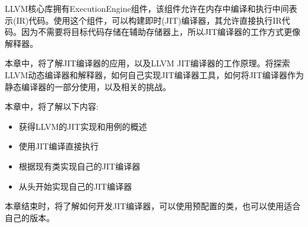 
LLVM核心库拥有ExecutionEngine组件，该组件允许在内存中编译和执行中间表示(IR)代码。使用这个组件，可以构建即时(JIT)编译器，其允许直接执行IR代码。因为不需要将目标代码存储在辅助存储器上，所以JIT编译器的工作方式更像解释器。

本章中，将了解JIT编译器的应用，以及LLVM JIT编译器的工作原理。将探索LLVM动态编译器和解释器，如何自己实现JIT编译器工具，如何将JIT编译器作为静态编译器的一部分使用，以及相关的挑战。

本章中，将了解以下内容:

\begin{itemize}
\item
获得LLVM的JIT实现和用例的概述

\item
使用JIT编译直接执行

\item
根据现有类实现自己的JIT编译器

\item
从头开始实现自己的JIT编译器
\end{itemize}

本章结束时，将了解如何开发JIT编译器，可以使用预配置的类，也可以使用适合自己的版本。





















